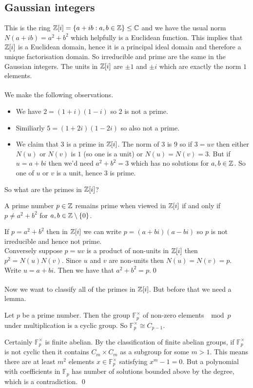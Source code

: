 \documentclass{article}
\begin{document}
\begin{itemize}
\subsection{Gaussian integers}
This is the ring $ \mathbb{Z}[i]=\{a+ib:a,b\in \mathbb{Z}\}\le \mathbb{C} $ and we have the usual norm $ N(a+ib)=a^2+b^2 $ which helpfully is a Euclidean function. This implies that $ \mathbb{Z}[i] $ is a Euclidean domain, hence it is a principal ideal domain and therefore a unique factorisation domain. So irreducible and prime are the same in the Gaussian integers. The units in $ \mathbb{Z}[i] $ are $ \pm 1 $ and $ \pm i $ which are exactly the norm $ 1 $ elements.\\\\
We make the following observations.
\begin{itemize}
	\item We have $ 2 = (1+i)(1-i)$ so $ 2 $ is not a prime.
	\item Similiarly $ 5=(1+2i)(1-2i) $ so also not a prime.
	\item We claim that $ 3 $ is a prime in $ \mathbb{Z}[i] $. The norm of $ 3 $ is $9 $ so if $ 3=uv $ then either $ N(u) $ or $ N(v) $ is $ 1 $ (so one is a unit) or $ N(u)=N(v)=3 $. But if $ u=a+bi $ then we'd need $ a^2+b^2=3 $ which has no solutions for $ a,b\in \mathbb{Z} $. So one of $ u $ or $ v $ is a unit, hence $ 3 $ is prime. 
\end{itemize} 
So what are the primes in $ \mathbb{Z}[i] $?
\begin{proposition}
	A prime number $ p\in \mathbb{Z} $ remains prime when viewed in $ \mathbb{Z}[i] $ if and only if $ p\ne a^2+b^2 $ for $ a,b\in \mathbb{Z}\setminus \{0\} $.
\end{proposition}
\pf If $ p=a^2+b^2 $ then in $ \mathbb{Z}[i] $ we can write $ p=(a+bi)(a-bi) $ so $ p $ is not irreducible and hence not prime.\\
Conversely suppose $ p = uv $ is a product of non-units in $ \mathbb{Z}[i] $ then $ p^2=N(u)N(v) $. Since $ u $ and $ v $ are non-units then $ N(u)=N(v)=p $. Write $ u=a+bi $. Then we have that $ a^2+b^2=p $.\qed
\\\\
Now we want to classify all of the primes in $ \mathbb{Z}[i] $. But before that we need a lemma.
\begin{lemma}
	Let $ p $ be a prime number. Then the group $ \mathbb F_p^\times $ of non-zero elements $ \mod p $ under multiplication is a cyclic group. So $ \mathbb F_p^\times \cong C_{p-1}. $
\end{lemma}
\pf
Certainly $ \mathbb F_p^\times $ is finite abelian. By the classification of finite abelian groups, if $ \mathbb F_p^\times $ is not cyclic then it contains $ C_m\times C_m  $ as a subgroup for some $ m>1 $. This means there are at least $ m^2 $ elements $ x\in \mathbb F_p^\times $ satisfying $ x^m-1=0 $. But a polynomial with coefficients in $ \mathbb F_p $ has number of solutions bounded above by the degree, which is a contradiction. \qed\\\\

\end{itemize}
\end{document}
